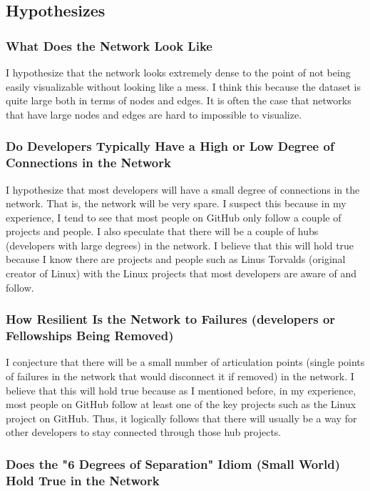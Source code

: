\documentclass[9pt,twocolumn,twoside]{pnas-new}
\begin{document}
\subsection{Hypothesizes}

\subsubsection{What Does the Network Look Like} I hypothesize that the network looks extremely dense to the point of not being easily visualizable without looking like a mess. I think this because the dataset is quite large both in terms of nodes and edges. It is often the case that networks that have large nodes and edges are hard to impossible to visualize.

\subsubsection{Do Developers Typically Have a High or Low Degree of Connections in the Network}

I hypothesize that most developers will have a small degree of connections in the network. That is, the network will be very spare. I suspect this because in my experience, I tend to see that most people on GitHub only follow a couple of projects and people. I also speculate that there will be a couple of hubs (developers with large degrees) in the network. I believe that this will hold true because I know there are projects and people such as Linus Torvalds (original creator of Linux) with the Linux projects that most developers are aware of and follow.

\subsubsection{How Resilient Is the Network to Failures (developers or Fellowships Being Removed)}

I conjecture that there will be a small number of articulation points (single points of failures in the network that would disconnect it if removed) in the network. I believe that this will hold true because as I mentioned before, in my experience, most people on GitHub follow at least one of the key projects such as the Linux project on GitHub. Thus, it logically follows that there will usually be a way for other developers to stay connected through those hub projects.

\subsubsection{Does the "6 Degrees of Separation" Idiom (Small World) Hold True in the Network}
\end{document}

